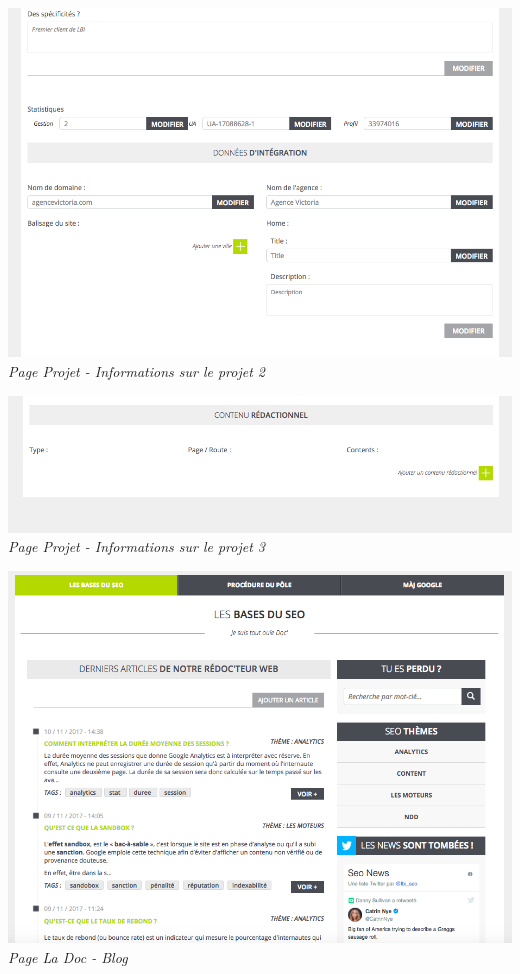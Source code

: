 \documentclass[12pt]{article}
\begin{document}
\begin{appendix}
\begin{center}
    \includegraphics[width = 15cm]{projetData5.png}
    \textit{Page Projet - Informations sur le projet 2}
    
    \includegraphics[width = 15cm]{projetData6.png}
    \textit{Page Projet - Informations sur le projet 3}
    
    \includegraphics[width = 15cm]{blog.png}
    \textit{Page La Doc - Blog}
    \end{center} 
\end{appendix}
\end{document}
